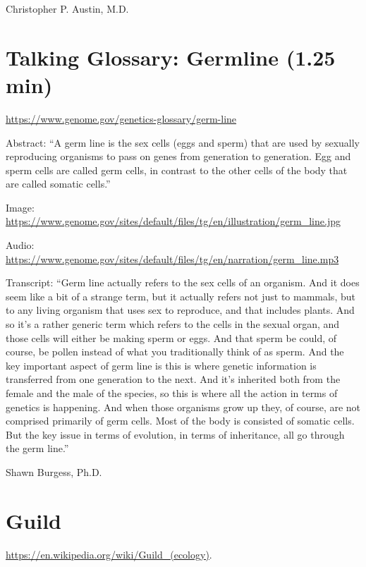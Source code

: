 \documentclass[
]{book}
\begin{document}
Christopher P. Austin, M.D.

\hypertarget{talking-glossary-germline-1.25-min}{%
\section{Talking Glossary: Germline (1.25 min)}\label{talking-glossary-germline-1.25-min}}

\url{https://www.genome.gov/genetics-glossary/germ-line}

Abstract: ``A germ line is the sex cells (eggs and sperm) that are used by sexually reproducing organisms to pass on genes from generation to generation. Egg and sperm cells are called germ cells, in contrast to the other cells of the body that are called somatic cells.''

Image: \url{https://www.genome.gov/sites/default/files/tg/en/illustration/germ_line.jpg}

Audio: \url{https://www.genome.gov/sites/default/files/tg/en/narration/germ_line.mp3}

Transcript: ``Germ line actually refers to the sex cells of an organism. And it does seem like a bit of a strange term, but it actually refers not just to mammals, but to any living organism that uses sex to reproduce, and that includes plants. And so it's a rather generic term which refers to the cells in the sexual organ, and those cells will either be making sperm or eggs. And that sperm be could, of course, be pollen instead of what you traditionally think of as sperm. And the key important aspect of germ line is this is where genetic information is transferred from one generation to the next. And it's inherited both from the female and the male of the species, so this is where all the action in terms of genetics is happening. And when those organisms grow up they, of course, are not comprised primarily of germ cells. Most of the body is consisted of somatic cells. But the key issue in terms of evolution, in terms of inheritance, all go through the germ line.''

Shawn Burgess, Ph.D.

\hypertarget{guild}{%
\section{Guild}\label{guild}}

\url{https://en.wikipedia.org/wiki/Guild_(ecology)}.
\end{document}
